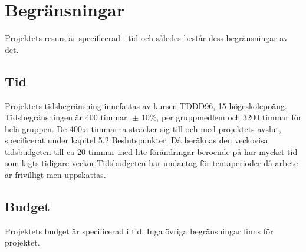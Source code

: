\section{Begränsningar}
Projektets resurs är specificerad i tid och således består dess begränsningar av det.
\subsection{Tid}
Projektets tidsbegränsning innefattas av kursen TDDD96, 15 högeskolepoäng. Tidsbegränsningen är 400 timmar ,$\pm$ 10\%, per gruppmedlem och 3200 timmar för hela gruppen. De 400:a timmarna sträcker sig till och med projektets avslut, specificerat under kapitel 5.2 Beslutspunkter. Då beräknas den veckovisa tidsbudgeten till ca 20 timmar med lite förändringar beroende på hur mycket tid som lagts tidigare veckor.Tidsbudgeten har undantag för tentaperioder då arbete är frivilligt men uppskattas. 
\subsection{Budget}
Projektets budget är specificerad i tid. Inga övriga begränsningar finns för projektet. 